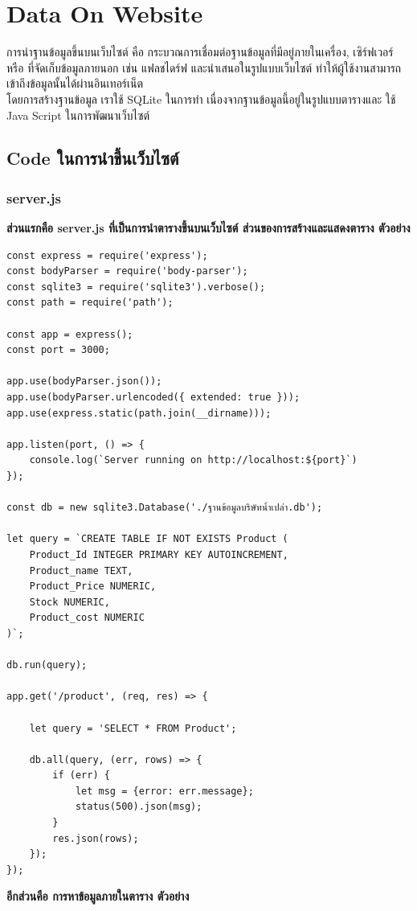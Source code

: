 \documentclass{report}
\begin{document}
\chapter{Data On Website}
การนำฐานข้อมูลขึ้นบนเว็บไซต์ คือ กระบวณการเชื่อมต่อฐานข้อมูลที่มีอยู่ภายในเครื่อง, เซิร์ฟเวอร์ หรือ ที่จัดเก็บข้อมูลภายนอก เช่น แฟลชไดร์ฟ และนำเสนอในรูปแบบเว็บไซต์ ทำให้ผู้ใช้งานสามารถเข้าถึงข้อมูลนั้นได้ผ่านอินเทอร์เน็ต\\
โดยการสร้างฐานข้อมูล เราใช้ SQLite ในการทำ เนื่องจากฐานข้อมูลนี้อยู่ในรูปแบบตารางและ ใช้ Java Script ในการพัฒนาเว็บไซต์
\section{Code ในการนำขึ้นเว็บไซต์}
\subsection{server.js}
\textbf{ส่วนแรกคือ server.js ที่เป็นการนำตารางขึ้นบนเว็บไซต์ ส่วนของการสร้างและแสดงตาราง ตัวอย่าง}
\begin{verbatim}
const express = require('express');
const bodyParser = require('body-parser');
const sqlite3 = require('sqlite3').verbose();
const path = require('path');

const app = express();
const port = 3000;

app.use(bodyParser.json());
app.use(bodyParser.urlencoded({ extended: true }));
app.use(express.static(path.join(__dirname)));

app.listen(port, () => {
    console.log(`Server running on http://localhost:${port}`)
});

const db = new sqlite3.Database('./ฐานข้อมูลบริษัทน้ำเปล่า.db');

let query = `CREATE TABLE IF NOT EXISTS Product (
    Product_Id INTEGER PRIMARY KEY AUTOINCREMENT,
    Product_name TEXT,
    Product_Price NUMERIC,
    Stock NUMERIC,
    Product_cost NUMERIC
)`;

db.run(query);

app.get('/product', (req, res) => {

    let query = 'SELECT * FROM Product';

    db.all(query, (err, rows) => {
        if (err) {
            let msg = {error: err.message};
            status(500).json(msg);
        }
        res.json(rows);
    });
});
\end{verbatim}
\textbf{อีกส่วนคือ การหาข้อมูลภายในตาราง ตัวอย่าง}
\end{document}
